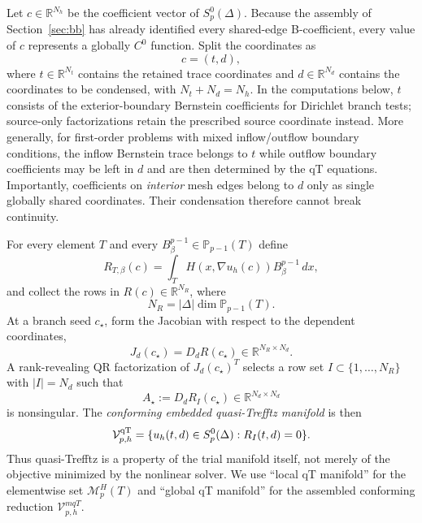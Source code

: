 \documentclass[preprint,12pt]{elsarticle}
\newcommand{\PP}{\mathbb P}
\newcommand{\grad}{\nabla}
\begin{document}
Let $c\in\mathbb R^{N_h}$ be the coefficient vector of $S_p^0(\Delta)$.  Because the assembly of Section~\ref{sec:bb} has already identified every shared-edge B-coefficient, every value of $c$ represents a globally $C^0$ function.  Split the coordinates as
\begin{equation}\label{eq:trace-deep-split}
 c=(t,d),
\end{equation}
where $t\in\mathbb R^{N_t}$ contains the retained trace coordinates and $d\in\mathbb R^{N_d}$ contains the coordinates to be condensed, with $N_t+N_d=N_h$.  In the computations below, $t$ consists of the exterior-boundary Bernstein coefficients for Dirichlet branch tests; source-only factorizations retain the prescribed source coordinate instead.  More generally, for first-order problems with mixed inflow/outflow boundary conditions, the inflow Bernstein trace belongs to $t$ while outflow boundary coefficients may be left in $d$ and are then determined by the qT equations.  Importantly, coefficients on \emph{interior} mesh edges belong to $d$ only as single globally shared coordinates.  Their condensation therefore cannot break continuity.

For every element $T$ and every $B^{p-1}_\beta\in\PP_{p-1}(T)$ define
\begin{equation}\label{eq:resrow}
 R_{T,\beta}(c)=\int_T H(x,\grad u_h(c))B^{p-1}_\beta\,dx,
\end{equation}
and collect the rows in $R(c)\in\mathbb R^{N_R}$, where
\[
 N_R=|\Delta|\dim\PP_{p-1}(T).
\]
At a branch seed $c_\star$, form the Jacobian with respect to the dependent coordinates,
\[
 J_d(c_\star)=D_dR(c_\star)\in\mathbb R^{N_R\times N_d}.
\]
A rank-revealing QR factorization of $J_d(c_\star)^T$ selects a row set $I\subset\{1,\ldots,N_R\}$ with $|I|=N_d$ such that
\begin{equation}\label{eq:pivotblock}
 A_\star:=D_dR_I(c_\star)\in\mathbb R^{N_d\times N_d}
\end{equation}
is nonsingular.  The \emph{conforming embedded quasi-Trefftz manifold} is then
\begin{equation}\label{eq:globalqtmanifold}
 \mathcal V_{p,h}^{\rm qT}
 =\{u_h(t,d)\in S_p^0(\Delta):R_I(t,d)=0\}.
\end{equation}
Thus quasi-Trefftz is a property of the trial manifold itself, not merely of the objective minimized by the nonlinear solver.  We use ``local qT manifold'' for the elementwise set $\mathcal M_p^H(T)$ and ``global qT manifold'' for the assembled conforming reduction $\mathcal V_{p,h}^{
m qT}$.
\end{document}
